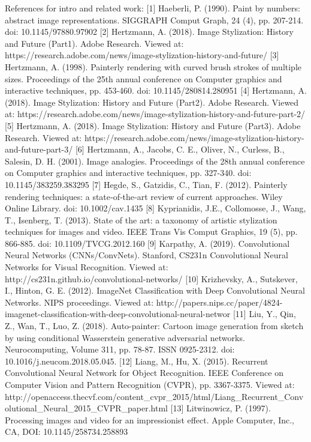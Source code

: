 \documentclass[runningheads]{llncs}
\begin{document}
References for intro and related work:
[1] Haeberli, P. (1990). Paint by numbers: abstract image representations. SIGGRAPH Comput Graph, 24 (4), pp. 207-214. doi: 10.1145/97880.97902
[2] Hertzmann, A. (2018). Image Stylization: History and Future (Part1). Adobe Research. Viewed at: https://research.adobe.com/news/image-stylization-history-and-future/
[3] Hertzmann, A. (1998). Painterly rendering with curved brush strokes of multiple sizes. Proceedings of the 25th annual conference on Computer graphics and interactive techniques, pp. 453-460. doi: 10.1145/280814.280951 
[4] Hertzmann, A. (2018). Image Stylization: History and Future (Part2). Adobe Research. Viewed at: https://research.adobe.com/news/image-stylization-history-and-future-part-2/
[5] Hertzmann, A. (2018). Image Stylization: History and Future (Part3). Adobe Research. Viewed at: https://research.adobe.com/news/image-stylization-history-and-future-part-3/
[6] Hertzmann, A., Jacobs, C. E., Oliver, N., Curless, B., Salesin, D. H. (2001). Image analogies. Proceedings of the 28th annual conference on Computer graphics and interactive techniques, pp. 327-340. doi: 10.1145/383259.383295 
[7] Hegde, S., Gatzidis, C., Tian, F. (2012). Painterly rendering techniques: a state‐of‐the‐art review of current approaches. Wiley Online Library. doi: 10.1002/cav.1435
[8] Kyprianidis, J.E., Collomosse, J., Wang, T., Isenberg, T. (2013). State of the art: a taxonomy of artistic stylization techniques for images and video. IEEE Trans Vis Comput Graphics, 19 (5), pp. 866-885. doi: 10.1109/TVCG.2012.160
[9] Karpathy, A. (2019). Convolutional Neural Networks (CNNs/ConvNets). Stanford, CS231n Convolutional Neural Networks for Visual Recognition. Viewed at:  http://cs231n.github.io/convolutional-networks/
[10] Krizhevsky, A., Sutskever, I., Hinton, G. E. (2012). ImageNet Classification with Deep Convolutional Neural Networks. NIPS proceedings. Viewed at: http://papers.nips.cc/paper/4824-imagenet-classification-with-deep-convolutional-neural-networ
[11] Liu, Y., Qin, Z., Wan, T., Luo, Z. (2018). Auto-painter: Cartoon image generation from sketch by using conditional Wasserstein generative adversarial networks. Neurocomputing, Volume 311, pp. 78-87. ISSN 0925-2312. doi: 10.1016/j.neucom.2018.05.045. 
[12] Liang, M., Hu, X. (2015). Recurrent Convolutional Neural Network for Object Recognition. IEEE Conference on Computer Vision and Pattern Recognition (CVPR), pp. 3367-3375. Viewed at: http://openaccess.thecvf.com/content_cvpr_2015/html/Liang_Recurrent_Convolutional_Neural_2015_CVPR_paper.html
[13] Litwinowicz, P. (1997). Processing images and video for an impressionist effect. Apple Computer, Inc., CA, DOI: 10.1145/258734.258893
\end{document}
